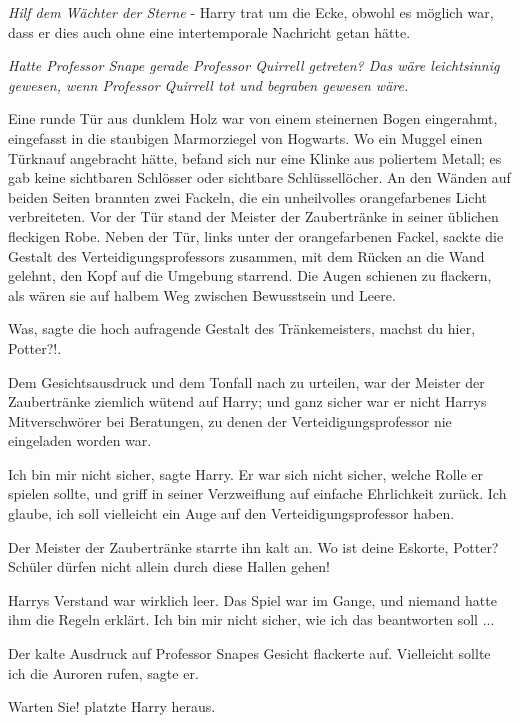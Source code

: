 \emph{Hilf dem Wächter der Sterne} - Harry trat um die Ecke, obwohl es möglich
war, dass er dies auch ohne eine intertemporale Nachricht getan hätte.

\emph{Hatte Professor Snape gerade Professor Quirrell getreten? Das wäre
leichtsinnig gewesen, wenn Professor Quirrell tot und begraben gewesen wäre.}

Eine runde Tür aus dunklem Holz war von einem steinernen Bogen eingerahmt,
eingefasst in die staubigen Marmorziegel von Hogwarts. Wo ein Muggel einen
Türknauf angebracht hätte, befand sich nur eine Klinke aus poliertem Metall; es
gab keine sichtbaren Schlösser oder sichtbare Schlüssellöcher. An den Wänden auf
beiden Seiten brannten zwei Fackeln, die ein unheilvolles orangefarbenes Licht
verbreiteten. Vor der Tür stand der Meister der Zaubertränke in seiner üblichen
fleckigen Robe. Neben der Tür, links unter der orangefarbenen Fackel, sackte die
Gestalt des Verteidigungsprofessors zusammen, mit dem Rücken an die Wand
gelehnt, den Kopf auf die Umgebung starrend. Die Augen schienen zu flackern, als
wären sie auf halbem Weg zwischen Bewusstsein und Leere.

\glqq{}Was\grqq{}, sagte die hoch aufragende Gestalt des Tränkemeisters, \glqq{}
machst du hier, Potter?!\grqq{}.

Dem Gesichtsausdruck und dem Tonfall nach zu urteilen, war der Meister der
Zaubertränke ziemlich wütend auf Harry; und ganz sicher war er nicht Harrys
Mitverschwörer bei Beratungen, zu denen der Verteidigungsprofessor nie
eingeladen worden war.

\glqq{}Ich bin mir nicht sicher\grqq{}, sagte Harry. Er war sich nicht sicher,
welche Rolle er spielen sollte, und griff in seiner Verzweiflung auf einfache
Ehrlichkeit zurück. \glqq{}Ich glaube, ich soll vielleicht ein Auge auf den
Verteidigungsprofessor haben.\grqq{}

Der Meister der Zaubertränke starrte ihn kalt an. \glqq{}Wo ist deine Eskorte,
Potter? Schüler dürfen nicht allein durch diese Hallen gehen!\grqq{}

Harrys Verstand war wirklich leer. Das Spiel war im Gange, und niemand hatte ihm
die Regeln erklärt. \glqq{}Ich bin mir nicht sicher, wie ich das beantworten
soll ...\grqq{}

Der kalte Ausdruck auf Professor Snapes Gesicht flackerte auf. \glqq{}Vielleicht
sollte ich die Auroren rufen\grqq{}, sagte er.

\glqq{}Warten Sie!\grqq{} platzte Harry heraus.

